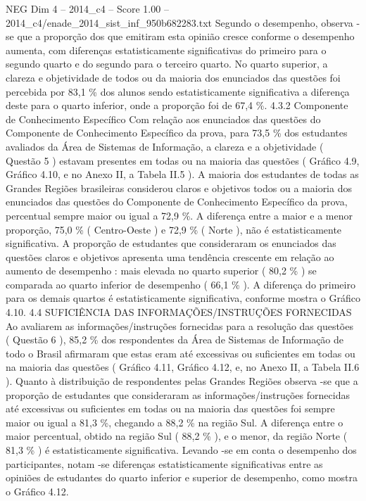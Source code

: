 \begin{textsample}{NEG Dim 4 – 2014\_c4 – Score 1.00 – 2014\_c4/enade\_2014\_sist\_inf\_950b682283.txt}
Segundo o desempenho, observa -se que a proporção dos que emitiram esta opinião cresce conforme o desempenho aumenta, com diferenças estatisticamente significativas do primeiro para o segundo quarto e do segundo para o terceiro quarto.
No quarto superior, a clareza e objetividade de todos ou da maioria dos enunciados das questões foi percebida por 83,1 \% dos alunos sendo estatisticamente significativa a diferença deste para o quarto inferior, onde a proporção foi de 67,4 \%. 4.3.2 Componente de Conhecimento Específico Com relação aos enunciados das questões do Componente de Conhecimento Específico da prova, para 73,5 \% dos estudantes avaliados da Área de Sistemas de Informação, a clareza e a objetividade ( Questão 5 ) estavam presentes em todas ou na maioria das questões ( Gráfico 4.9, Gráfico 4.10, e no Anexo II, a Tabela II.5 ).
A maioria dos estudantes de todas as Grandes Regiões brasileiras considerou claros e objetivos todos ou a maioria dos enunciados das questões do Componente de Conhecimento Específico da prova, percentual sempre maior ou igual a 72,9 \%.
A diferença entre a maior e a menor proporção, 75,0 \% ( Centro-Oeste ) e 72,9 \% ( Norte ), não é estatisticamente significativa.
A proporção de estudantes que consideraram os enunciados das questões claros e objetivos apresenta uma tendência crescente em relação ao aumento de desempenho : mais elevada no quarto superior ( 80,2 \% ) se comparada ao quarto inferior de desempenho ( 66,1 \% ).
A diferença do primeiro para os demais quartos é estatisticamente significativa, conforme mostra o Gráfico 4.10. 4.4 SUFICIÊNCIA DAS INFORMAÇÕES/INSTRUÇÕES FORNECIDAS Ao avaliarem as informações/instruções fornecidas para a resolução das questões ( Questão 6 ), 85,2 \% dos respondentes da Área de Sistemas de Informação de todo o Brasil afirmaram que estas eram até excessivas ou suficientes em todas ou na maioria das questões ( Gráfico 4.11, Gráfico 4.12, e, no Anexo II, a Tabela II.6 ).
Quanto à distribuição de respondentes pelas Grandes Regiões observa -se que a proporção de estudantes que consideraram as informações/instruções fornecidas até excessivas ou suficientes em todas ou na maioria das questões foi sempre maior ou igual a 81,3 \%, chegando a 88,2 \% na região Sul.
A diferença entre o maior percentual, obtido na região Sul ( 88,2 \% ), e o menor, da região Norte ( 81,3 \% ) é estatisticamente significativa.
Levando -se em conta o desempenho dos participantes, notam -se diferenças estatisticamente significativas entre as opiniões de estudantes do quarto inferior e superior de desempenho, como mostra o Gráfico 4.12.

\end{textsample}
